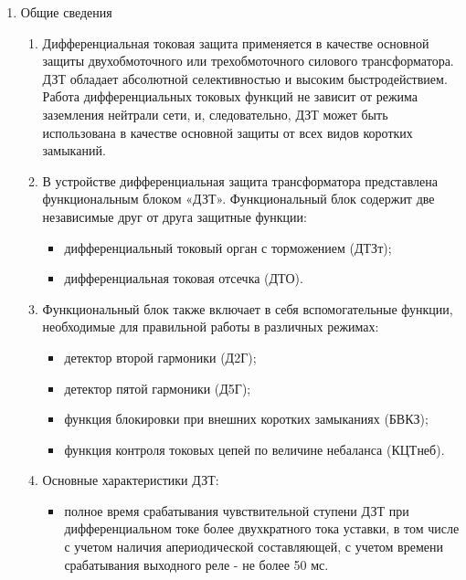 
\color{black}

\begin{enumerate}
\item Общие сведения

\begin{enumerate}

\item
Дифференциальная токовая защита применяется в качестве основной защиты двухобмоточного или трехобмоточного силового трансформатора. ДЗТ обладает абсолютной селективностью и высоким быстродействием. Работа дифференциальных токовых функций не зависит от режима заземления нейтрали сети, и, следовательно, ДЗТ  может быть использована в качестве основной защиты от всех видов коротких замыканий.

\item
В устройстве дифференциальная защита трансформатора представлена функциональным блоком «ДЗТ». Функциональный блок содержит две независимые друг от друга защитные функции:
\begin{itemize}
\item дифференциальный токовый орган с торможением (ДТЗт);
\item дифференциальная токовая отсечка (ДТО).
\end{itemize}
\item
Функциональный блок также включает в себя вспомогательные функции, необходимые для правильной работы в различных режимах:
\begin{itemize}
    \item детектор второй гармоники (Д2Г);
    \item детектор пятой гармоники (Д5Г);
    \item функция блокировки при внешних коротких замыканиях (БВКЗ);
    \item функция контроля токовых цепей по величине небаланса (КЦТнеб).
\end{itemize}

\item
Основные характеристики ДЗТ:
\begin{itemize}
    \item полное время срабатывания чувствительной ступени ДЗТ при дифференциальном токе более двухкратного тока уставки, в том числе с учетом наличия апериодической составляющей, с учетом времени срабатывания выходного реле - не более 50 мс.
\end{itemize}


\end{enumerate}
\end{enumerate}
